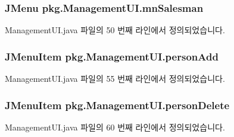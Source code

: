 \subsubsection[{\texorpdfstring{mn\+Salesman}{mnSalesman}}]{\setlength{\rightskip}{0pt plus 5cm}J\+Menu pkg.\+Management\+U\+I.\+mn\+Salesman\hspace{0.3cm}{\ttfamily [private]}}\hypertarget{classpkg_1_1_management_u_i_a240bf0c46a930b09db9d727ce86c6ec7}{}\label{classpkg_1_1_management_u_i_a240bf0c46a930b09db9d727ce86c6ec7}


Management\+U\+I.\+java 파일의 50 번째 라인에서 정의되었습니다.

\subsubsection[{\texorpdfstring{person\+Add}{personAdd}}]{\setlength{\rightskip}{0pt plus 5cm}J\+Menu\+Item pkg.\+Management\+U\+I.\+person\+Add\hspace{0.3cm}{\ttfamily [private]}}\hypertarget{classpkg_1_1_management_u_i_a4781978da9cf1df76dde465ccdadc9f7}{}\label{classpkg_1_1_management_u_i_a4781978da9cf1df76dde465ccdadc9f7}


Management\+U\+I.\+java 파일의 55 번째 라인에서 정의되었습니다.

\subsubsection[{\texorpdfstring{person\+Delete}{personDelete}}]{\setlength{\rightskip}{0pt plus 5cm}J\+Menu\+Item pkg.\+Management\+U\+I.\+person\+Delete\hspace{0.3cm}{\ttfamily [private]}}\hypertarget{classpkg_1_1_management_u_i_af5e74a22293246fcc049a6e21024e96f}{}\label{classpkg_1_1_management_u_i_af5e74a22293246fcc049a6e21024e96f}


Management\+U\+I.\+java 파일의 60 번째 라인에서 정의되었습니다.


